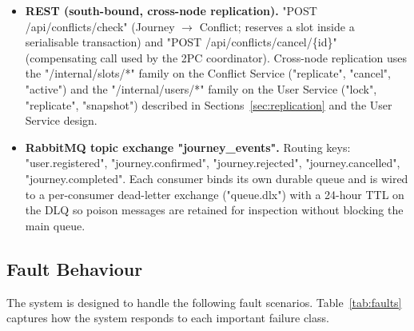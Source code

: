 \documentclass[11pt,a4paper]{article}
\begin{document}
\begin{itemize}
  \item \textbf{REST (south-bound, cross-node replication).}
    "POST /api/conflicts/check" (Journey $\to$ Conflict; reserves
    a slot inside a serialisable transaction) and
    "POST /api/conflicts/cancel/\{id\}" (compensating call used
    by the 2PC coordinator). Cross-node replication uses the
    "/internal/slots/*" family on the Conflict Service
    ("replicate", "cancel", "active") and the
    "/internal/users/*" family on the User Service
    ("lock", "replicate", "snapshot") described in
    Sections~\ref{sec:replication} and the User Service design.
  \item \textbf{RabbitMQ topic exchange "journey\_events".}
    Routing keys: "user.registered", "journey.confirmed",
    "journey.rejected", "journey.cancelled",
    "journey.completed". Each consumer binds its own durable
    queue and is wired to a per-consumer dead-letter exchange
    ("{queue}.dlx") with a 24-hour TTL on the DLQ so poison
    messages are retained for inspection without blocking the main
    queue.
\end{itemize}

\subsection{Fault Behaviour}
 
The system is designed to handle the following fault scenarios. Table~\ref{tab:faults} captures how the system responds to each important failure class.
\end{document}

